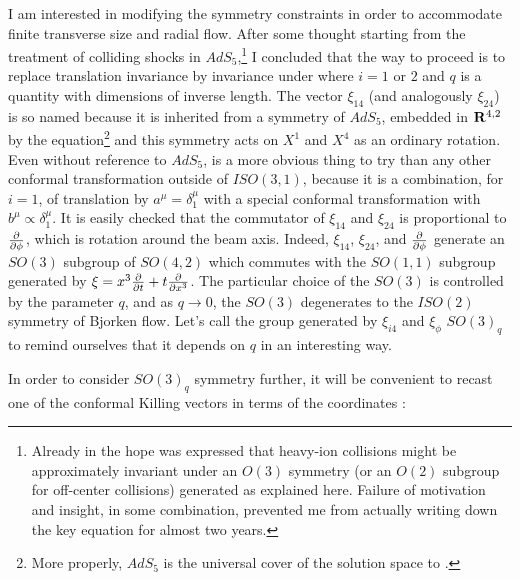 \documentclass[12pt]{article}
\begin{document}
I am interested in modifying the symmetry constraints in order to accommodate finite transverse size and radial flow.  After some thought starting from the treatment \cite{Gubser:2008pc,Gubser:2009sx} of colliding shocks in $AdS_5$,\footnote{Already in \cite{Gubser:2008pc,Gubser:2009sx} the hope was expressed that heavy-ion collisions might be approximately invariant under an $O(3)$ symmetry (or an $O(2)$ subgroup for off-center collisions) generated as explained here.  Failure of motivation and insight, in some combination, prevented me from actually writing down the key equation  for almost two years.} I concluded that the way to proceed is to replace translation invariance by invariance under
where $i=1$ or $2$ and $q$ is a quantity with dimensions of inverse length.  The vector $\xi_{14}$ (and analogously $\xi_{24}$) is so named because it is inherited from a symmetry of $AdS_5$, embedded in ${\bf R}^{4,2}$ by the equation\footnote{More properly, $AdS_5$ is the universal cover of the solution space to .}
and this symmetry acts on $X^1$ and $X^4$ as an ordinary rotation.  Even without reference to $AdS_5$,  is a more obvious thing to try than any other conformal transformation outside of $ISO(3,1)$, because it is a combination, for $i=1$, of translation by $a^\mu = \delta^\mu_1$ with a special conformal transformation with $b^\mu \propto \delta^\mu_1$.  It is easily checked that the commutator of $\xi_{14}$ and $\xi_{24}$ is proportional to ${\partial \over \partial\phi}$, which is rotation around the beam axis.  Indeed, $\xi_{14}$, $\xi_{24}$, and ${\partial \over \partial\phi}$ generate an $SO(3)$ subgroup of $SO(4,2)$ which commutes with the $SO(1,1)$ subgroup generated by $\xi = x^3 {\partial \over \partial t} + t {\partial \over \partial x^3}$.  The particular choice of the $SO(3)$ is controlled by the parameter $q$, and as $q \to 0$, the $SO(3)$ degenerates to the $ISO(2)$ symmetry of Bjorken flow.  Let's call the group generated by $\xi_{i4}$ and $\xi_\phi$ $SO(3)_q$ to remind ourselves that it depends on $q$ in an interesting way.

In order to consider $SO(3)_q$ symmetry further, it will be convenient to recast one of the conformal Killing vectors  in terms of the coordinates :
\end{document}
